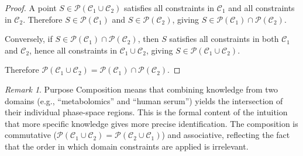 \documentclass[11pt,twocolumn,a4paper]{article}
\theoremstyle{definition}
\theoremstyle{remark}
\newtheorem{remark}[theorem]{Remark}
\newcommand{\Purpose}{\mathcal{P}}
\newcommand{\Context}{\mathcal{C}}
\begin{document}
\begin{proof}
A point $S \in \Purpose(\Context_1 \cup \Context_2)$ satisfies all constraints in $\Context_1$ and all constraints in $\Context_2$. Therefore $S \in \Purpose(\Context_1)$ and $S \in \Purpose(\Context_2)$, giving $S \in \Purpose(\Context_1) \cap \Purpose(\Context_2)$.

Conversely, if $S \in \Purpose(\Context_1) \cap \Purpose(\Context_2)$, then $S$ satisfies all constraints in both $\Context_1$ and $\Context_2$, hence all constraints in $\Context_1 \cup \Context_2$, giving $S \in \Purpose(\Context_1 \cup \Context_2)$.

Therefore $\Purpose(\Context_1 \cup \Context_2) = \Purpose(\Context_1) \cap \Purpose(\Context_2)$.
\end{proof}

\begin{remark}
Purpose Composition means that combining knowledge from two domains (e.g., ``metabolomics'' and ``human serum'') yields the intersection of their individual phase-space regions. This is the formal content of the intuition that more specific knowledge gives more precise identification. The composition is commutative ($\Purpose(\Context_1 \cup \Context_2) = \Purpose(\Context_2 \cup \Context_1)$) and associative, reflecting the fact that the order in which domain constraints are applied is irrelevant.
\end{remark}
\end{document}

